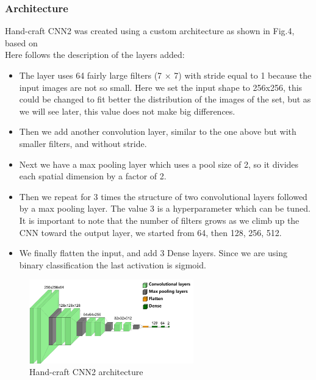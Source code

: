 \documentclass[conference]{IEEEtran}
\begin{document}
\subsubsection{Architecture}
Hand-craft CNN2 was created using a custom architecture as shown in Fig.4, based on \cite{hands-on}\\
Here follows the description of the layers added:
\begin{itemize}
    \item The layer uses 64 fairly large filters (7 × 7) with stride equal to 1 because  the input images are not so small. Here we set the input shape to 256x256, this could be changed to fit better the distribution of the images of the set, but as we will see later, this value does not make big differences.
    \item Then we add another convolution layer, similar to the one above but with smaller filters, and without stride.
    \item Next we have a max pooling layer which uses a pool size of 2, so it divides each spatial dimension by a factor of 2.
    \item Then we repeat for 3 times the structure of two convolutional layers followed by a max pooling layer. The value 3 is a hyperparameter which can be tuned. It is important to note that the number of filters grows as we climb up the CNN toward the output layer, we started from 64, then 128, 256, 512. 
    \item We finally flatten the input, and add 3 Dense layers. Since we are using binary classification the last activation is sigmoid.
    
\end{itemize}

\begin{figure}[ht!] %
\centering
\includegraphics[width=2.8in]{CNN2.pdf}
\caption{ Hand-craft CNN2 architecture}
\label{bench}
\end{figure}
\end{document}

